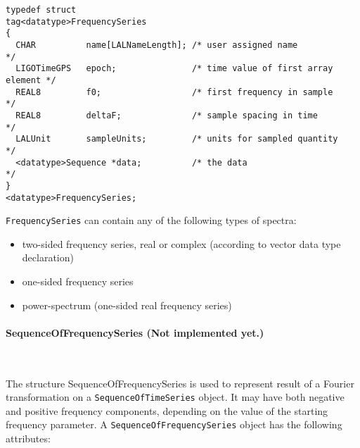 \documentclass[]{ligodcc}
\renewcommand{\texttt}[1]{{\ttfamily\color{blue}#1}}
\begin{document}
{\footnotesize
\begin{verbatim}
typedef struct
tag<datatype>FrequencySeries
{
  CHAR          name[LALNameLength]; /* user assigned name                */
  LIGOTimeGPS   epoch;               /* time value of first array element */
  REAL8         f0;                  /* first frequency in sample         */
  REAL8         deltaF;              /* sample spacing in time            */
  LALUnit       sampleUnits;         /* units for sampled quantity        */
  <datatype>Sequence *data;          /* the data                          */
}
<datatype>FrequencySeries;
\end{verbatim}}

\noindent
{\tt FrequencySeries} can contain any of the following types of spectra:
\begin{itemize}
\item
two-sided frequency series, real or complex (according to vector data
type declaration)
\vspace{-0.15in}
\item
one-sided frequency series
\vspace{-0.15in}
\item
power-spectrum (one-sided real frequency series)
\end{itemize}

\paragraph{{\texttt {SequenceOfFrequencySeries}} {\bf (Not implemented
yet.)} }~


The structure SequenceOfFrequencySeries is used to represent result of
a Fourier transformation on a {\tt SequenceOfTimeSeries} object. It
may have both negative and positive frequency components, depending
on the value of the starting frequency parameter. A
{\tt SequenceOfFrequencySeries} object has the following attributes:
\end{document}
